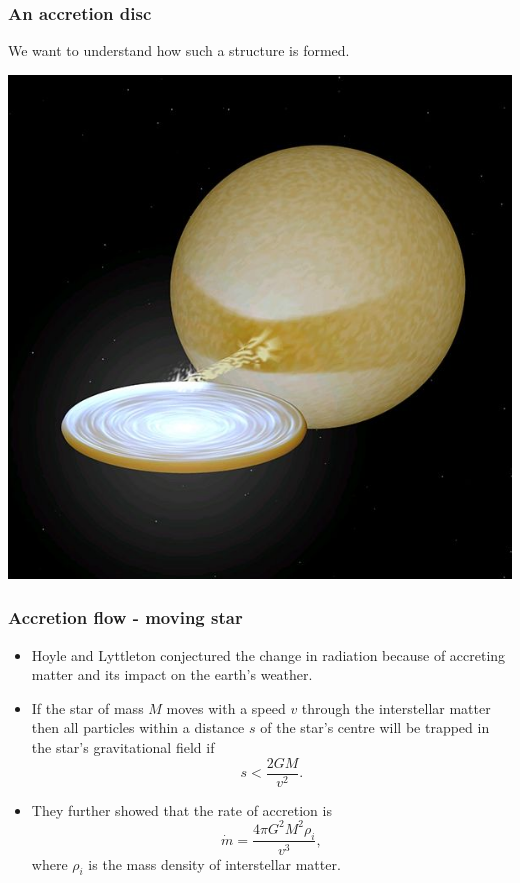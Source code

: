 \documentclass{beamer}
\begin{document}
\begin{frame}
\frametitle{An accretion disc}
We want to understand how such a structure is formed.
\begin{center}
\includegraphics[scale=0.25]{600px-Low-mass_X-ray_binary}
\end{center}
\end{frame}

\begin{frame}
\frametitle{Accretion flow -  moving star}
\begin{itemize}
\item Hoyle and Lyttleton  conjectured the change in radiation because of accreting matter and its impact on the earth's weather. 
\item If the star of mass $M$ moves with a speed $v$ through the interstellar matter then all particles within a distance $s$ of the star's centre
will be trapped in the star's gravitational field if
\begin{equation}\label{e3}
s < \frac{2GM}{v^2}.
\end{equation}
\item They further showed that the rate of accretion is
\begin{equation}\label{e4}
\dot{m} = \frac{4\pi G^2M^2\rho_i}{v^3},
\end{equation}
where $\rho_i$ is the mass density of interstellar matter.
\end{itemize}
\end{frame}
\end{document}
